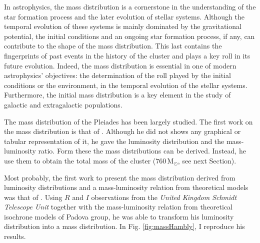 In astrophysics, the mass distribution is a cornerstone in the understanding of the star formation process and the later evolution of stellar systems. Although the temporal evolution of these systems is mainly dominated by the gravitational potential, the initial conditions and an ongoing star formation process, if any, can contribute to the shape of the mass distribution. This last contains the fingerprints of past events in the history of the cluster and plays a key roll in its future evolution. Indeed, the mass distribution is essential in one of modern astrophysics' objectives: the determination of the roll played by the initial conditions or the environment, in the temporal evolution of the stellar systems. Furthermore, the initial mass distribution is a key element in the study of galactic and extragalactic populations.  

The mass distribution of the Pleiades has been largely studied. The first work on the mass distribution is that of \citet{Limber1962}. Although he did not shows any graphical or tabular representation of it, he gave the luminosity distribution and the mass-luminosity ratio. Form these the mass distributions can be derived. Instead, he use them to obtain the total mass of the cluster ($760\,\mathrm{M_{\odot}}$, see next Section). 

Most probably, the first work to present the mass distribution derived from luminosity distributions and a mass-luminosity relation from theoretical models was that of \citet{Hambly1991}. Using $R$ and $I$ observations from the \emph{United Kingdom Schmidt Telescope Unit} together with the mass-luminosity relation from theoretical isochrone models of Padova group, he was able to transform his luminosity distribution into a mass distribution. In Fig. \ref{fig:massHambly}, I reproduce his results. 

